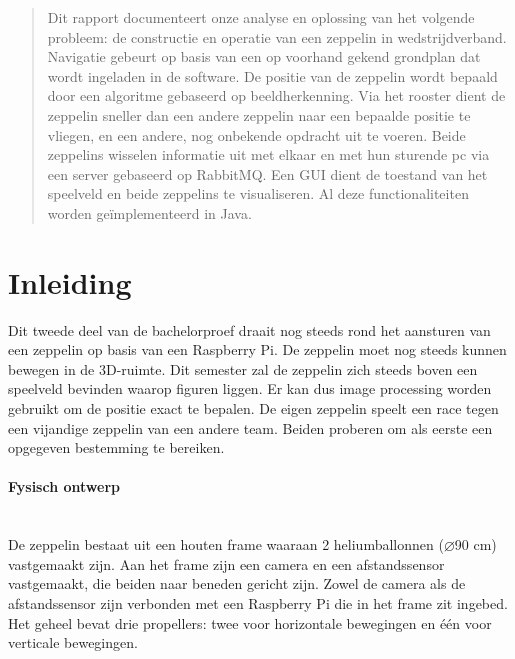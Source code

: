 \documentclass[tt]{penoverslag}
\begin{document}
\maketitlepage


\begin{abstract}
\noindent
Dit rapport documenteert onze analyse en oplossing van het volgende probleem: de constructie en operatie van een zeppelin in wedstrijdverband. Navigatie gebeurt op basis van een op voorhand gekend grondplan dat wordt ingeladen in de software. De positie van de zeppelin wordt bepaald door een algoritme gebaseerd op beeldherkenning. Via het rooster dient de zeppelin sneller dan een andere zeppelin naar een bepaalde positie te vliegen, en een andere, nog onbekende opdracht uit te voeren. Beide zeppelins wisselen informatie uit met elkaar en met hun sturende pc via een server gebaseerd op RabbitMQ. Een GUI dient de toestand van het speelveld en beide zeppelins te visualiseren. Al deze functionaliteiten worden ge\"{i}mplementeerd in Java.
\end{abstract}


\tableofcontents\newpage


\section{Inleiding}
Dit tweede deel van de bachelorproef draait nog steeds rond het aansturen van een zeppelin op basis van een Raspberry Pi. De zeppelin moet nog steeds kunnen bewegen in de 3D-ruimte. Dit semester zal de zeppelin zich steeds boven een speelveld bevinden waarop figuren liggen. Er kan dus image processing worden gebruikt om de positie exact te bepalen. De eigen zeppelin speelt een race tegen een vijandige zeppelin van een andere team. Beiden proberen om als eerste een opgegeven bestemming te bereiken.

\paragraph{Fysisch ontwerp}
~\\
De zeppelin bestaat uit een houten frame waaraan 2 heliumballonnen ($\diameter$90 cm) vastgemaakt zijn. Aan het frame zijn een camera en een afstandssensor vastgemaakt, die beiden naar beneden gericht zijn. Zowel de camera als de afstandssensor zijn verbonden met een Raspberry Pi die in het frame zit ingebed. Het geheel bevat drie propellers: twee voor horizontale bewegingen en \'{e}\'{e}n voor verticale bewegingen.
\end{document}
